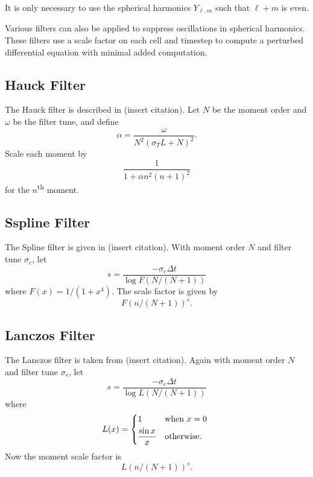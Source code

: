 \documentclass{article}
\begin{document}
It is only necessary to use the spherical harmonics $Y_{\ell,m}$ such that
$\ell + m$ is even.

Various filters can also be applied to suppress oscillations in spherical harmonics.
These filters use a scale factor on each cell and timestep to compute a
perturbed differential equation with minimal added computation.

\subsection{Hauck Filter}
The Hauck filter is described in (insert citation).
Let $N$ be the moment order and $\omega$ be the filter tune, and define
\begin{equation}
    \alpha = \frac{\omega}{N^2 (\sigma_T L + N)^2}.
\end{equation}
Scale each moment by
\begin{equation}
    \frac{1}{1 + \alpha n^2 (n+1)^2}
\end{equation}
for the $n$\textsuperscript{th} moment.

\subsection{Sspline Filter}
The Spline filter is given in (insert citation).
With moment order $N$ and filter tune $\sigma_e$, let
\begin{equation}
    s = \frac{-\sigma_e \Delta t}{\log F(N/(N+1))}
\end{equation}
where $F(x) = 1/(1 + x^4)$. The scale factor is given by
\begin{equation}
    F(n/(N+1))^s.
\end{equation}

\subsection{Lanczos Filter}
The Lanczos filter is taken from (insert citation).
Again with moment order $N$ and filter tune $\sigma_e$, let
\begin{equation}
    s = \frac{-\sigma_e \Delta t}{\log L(N / (N+1))}
\end{equation}
where
\begin{equation}
    L(x) = \begin{dcases*}
        1 & when $x=0$ \\
        \frac{\sin x}{x} & otherwise.
    \end{dcases*}
\end{equation}
Now the moment scale factor is
\begin{equation}
    L(n / (N+1))^s.
\end{equation}
\end{document}
